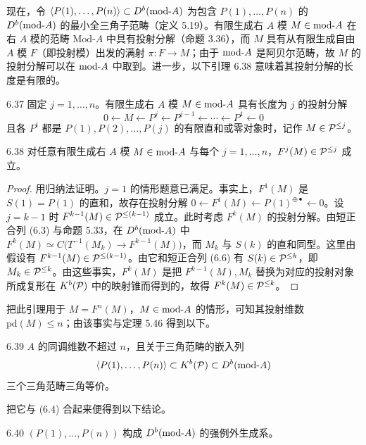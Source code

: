 现在，令 $\langle P(1),\dots,P(n)\rangle\subset D^{b}(\mathrm{mod}\text{-}A)$ 为包含 $P(1),\dots,P(n)$ 的 $D^{b}(\mathrm{mod}\text{-}A)$ 的最小全三角子范畴（定义 5.19）。有限生成右 $A$ 模 $M\in\mathrm{mod}\text{-}A$ 在右 $A$ 模的范畴 $\mathrm{Mod}\text{-}A$ 中具有投射分解（命题 3.36），而 $M$ 具有从有限生成自由 $A$ 模 $F$（即投射模）出发的满射 $\pi\colon F\to M$；由于 $\mathrm{mod}\text{-}A$ 是阿贝尔范畴，故 $M$ 的投射分解可以在 $\mathrm{mod}\text{-}A$ 中取到。进一步，以下引理 6.38 意味着其投射分解的长度是有限的。

\begin{definition}{6.37}
固定 $j=1,\dots,n$。有限生成右 $A$ 模 $M\in\mathrm{mod}\text{-}A$ 具有长度为 $j$ 的投射分解
\begin{equation}
0\leftarrow M\leftarrow P^{j}\leftarrow P^{j-1}\leftarrow\cdots\leftarrow P^{1}\leftarrow 0 \tag{6.7}
\end{equation}
且各 $P^{i}$ 都是 $P(1),P(2),\dots,P(j)$ 的有限直和或零对象时，记作 $M\in\mathcal{P}^{\le j}$。
\end{definition}

\begin{lemma}{6.38}
对任意有限生成右 $A$ 模 $M\in\mathrm{mod}\text{-}A$ 与每个 $j=1,\dots,n$，$F^{j}(M)\in\mathcal{P}^{\le j}$ 成立。
\end{lemma}

\begin{proof}
用归纳法证明。$j=1$ 的情形题意已满足。事实上，$F^{1}(M)$ 是 $S(1)=P(1)$ 的直和，故存在投射分解 $0\leftarrow F^{1}(M)\leftarrow P(1)^{\oplus\bullet}\leftarrow 0$。设 $j=k-1$ 时 $F^{k-1}(M)\in\mathcal{P}^{\le(k-1)}$ 成立。此时考虑 $F^{k}(M)$ 的投射分解。由短正合列 (6.3) 与命题 5.33，在 $D^{b}(\mathrm{mod}\text{-}A)$ 中 $F^{k}(M)\simeq C\bigl(T^{-1}(M_k)\to F^{k-1}(M)\bigr)$，而 $M_k$ 与 $S(k)$ 的直和同型。这里由假设有 $F^{k-1}(M)\in\mathcal{P}^{\le(k-1)}$。由它和短正合列 (6.6) 有 $S(k)\in\mathcal{P}^{\le k}$，即 $M_k\in\mathcal{P}^{\le k}$。由这些事实，$F^{k}(M)$ 是把 $F^{k-1}(M),M_k$ 替换为对应的投射对象所成复形在 $K^{b}(\mathcal{P})$ 中的映射锥而得到的，故得 $F^{k}(M)\in\mathcal{P}^{\le k}$。
\end{proof}

把此引理用于 $M=F^{n}(M)$，$M\in\mathrm{mod}\text{-}A$ 的情形，可知其投射维数 $\mathrm{pd}(M)\le n$；由该事实与定理 5.46 得到以下。

\begin{theorem}{6.39}
$A$ 的同调维数不超过 $n$，且关于三角范畴的嵌入列
\[
\langle P(1),\dots,P(n)\rangle\subset K^{b}(\mathcal{P})\subset D^{b}(\mathrm{mod}\text{-}A)
\]
三个三角范畴三角等价。
\end{theorem}

把它与 (6.4) 合起来便得到以下结论。

\begin{corollary}{6.40}
$(P(1),\dots,P(n))$ 构成 $D^{b}(\mathrm{mod}\text{-}A)$ 的强例外生成系。
\end{corollary}

